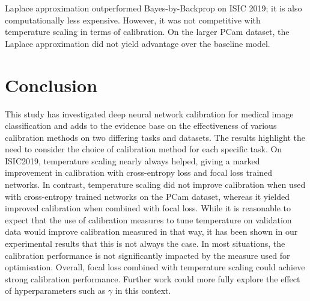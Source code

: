 Laplace approximation outperformed Bayes-by-Backprop on ISIC 2019; it is also computationally less expensive. However, it was not competitive with temperature scaling in terms of calibration. On the larger PCam dataset, the Laplace approximation did not yield advantage over the baseline model.



\section{Conclusion}
\label{sec:calibration_conclusion}
This study has investigated deep neural network calibration for medical image classification and adds to the evidence base on the effectiveness of various calibration methods on two differing tasks and datasets. The results highlight the need to consider the choice of calibration method for each specific task. On ISIC2019, temperature scaling nearly always helped, giving a marked improvement in calibration with cross-entropy loss and focal loss trained networks. In contrast, temperature scaling did not improve calibration when used with cross-entropy trained networks on the PCam dataset, whereas it yielded improved calibration when combined with focal loss. While it is reasonable to expect that the use of calibration measures to tune temperature on validation data would improve calibration measured in that way, it has been shown in our experimental results that this is not always the case. In most situations, the calibration performance is not significantly impacted by the measure used for optimisation. Overall, focal loss combined with temperature scaling could achieve strong calibration performance. Further work could more fully explore the effect of hyperparameters such as $\gamma$ in this context.